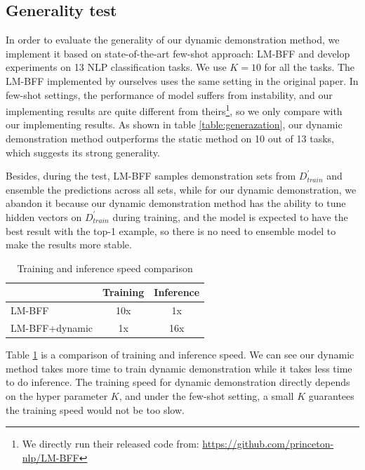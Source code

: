 \subsection{Generality test}
\label{sec:ga}
In order to evaluate the generality of our dynamic demonstration 
method, we implement it based on state-of-the-art few-shot approach: LM-BFF 
and develop experiments on 13 NLP classification tasks.
We use $K=10$ for all the tasks.
The LM-BFF implemented by ourselves uses the same setting in the original paper. In few-shot settings, the performance of model suffers from instability, and our implementing results are quite different from theirs\footnote{We directly run their released code from: \url{https://github.com/princeton-nlp/LM-BFF}}, so we only compare with our implementing results. As shown in table \ref{table:generazation}, our dynamic demonstration method outperforms the static method on 10 out of 13 tasks, which suggests its strong generality. 

Besides, during the test, LM-BFF samples demonstration sets from $D_{train}^{'}$ and ensemble the predictions across all sets, while for our dynamic demonstration, we abandon it because our dynamic demonstration method has the ability to tune hidden vectors on $D_{train}^{'}$ during training, and the model is expected to have the best result with the top-1 example, so there is no need to ensemble model to make the results more stable.

\begin{table}[!h]
	\centering
	\small
	\begin{tabular}{l|cc}
		\toprule
		 & \textbf{Training} & \textbf{Inference}\\
		\midrule
		LM-BFF  & 10x &  1x \\
		LM-BFF+dynamic   & 1x &  16x \\
		\bottomrule
	\end{tabular}
	\caption{Training and inference speed comparison}
	\label{table:time}
\end{table}

Table \ref{table:time} is a comparison of training and inference speed. We can see our dynamic method takes more time to train dynamic demonstration while it takes less time to do inference. The training speed for dynamic demonstration directly depends on the hyper parameter $K$, and under the few-shot setting, a small $K$ guarantees the training speed would not be too slow.

